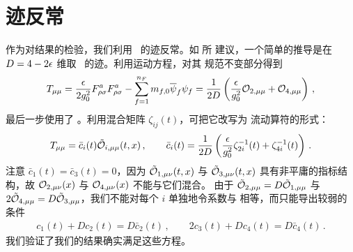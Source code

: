 \section{迹反常}\label{sec:traceanom}

作为对结果的检验，我们利用 \emt\ 的迹反常。如  所
建议，一个简单的推导是在 $D=4 - 2 \epsilon$ 维取 \emt\ 的迹。利用运动方程，对其
规范不变部分得到
\begin{equation}
	T_{\mu \mu} = \frac{\epsilon}{2 g_0^2} F_{\rho \sigma}^a F_{\rho
          \sigma}^a - \sum_{f=1}^{n_F} m_{f, 0} \overline{\psi}_f \psi_f =
        \frac{1}{2D}\left(\frac{\epsilon}{g_0^2}
        \mathcal{O}_{2,\mu\mu}+\mathcal{O}_{4,\mu\mu}\right)
        \,,
	\label{eq:EMTabare}
\end{equation}
最后一步使用了 。利用混合矩阵 $\zeta_{i j}(t)$，可把它改写为
流动算符的形式：
\begin{equation}
\begin{split}
  T_{\mu\mu} =  \bar c_i(t)\tilde{\mathcal{O}}_{i,\mu\mu}(t,x)\,,\qquad
  \bar c_i(t) = \frac{1}{2D}\left(
  \frac{\epsilon}{ g_0^2} \zeta_{2 i}^{-1}(t)
         + \zeta_{4 i}^{-1}(t)\right)\,.
	 \label{eq:EMTaflowed}
  \end{split}
\end{equation}
注意 $\bar{c}_1 (t) = \bar{c}_3 (t) = 0$，因为 $\tilde{\mathcal{O}}_{1, \mu \nu} (t, x)$
与 $\tilde{\mathcal{O}}_{3, \mu \nu} (t, x)$ 具有非平庸的指标结构，故
$\mathcal{O}_{2, \mu \nu} (x)$ 与 $\mathcal{O}_{4, \mu \nu} (x)$ 不能与它们混合。
由于 $\tilde{\mathcal{O}}_{2,\mu\mu}=D\tilde{\mathcal{O}}_{1,\mu\mu}$ 与
$2\tilde{\mathcal{O}}_{4,\mu\mu}=D\tilde{\mathcal{O}}_{3,\mu\mu}$，我们不能对每个 $i$ 单独地令系数与
 相等，而只能导出较弱的条件
\begin{equation}
  \begin{split}
    c_1(t)+Dc_2(t) = D\bar c_2(t)\,,\qquad
    2c_3(t)+Dc_4(t) = D\bar c_4(t)\,.
  \end{split}
\end{equation}
我们验证了我们的结果确实满足这些方程。
